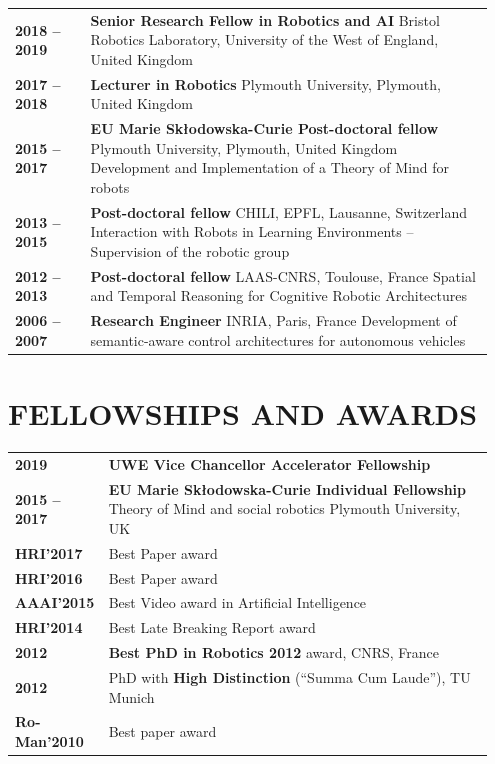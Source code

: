 \documentclass[11pt,a4paper]{report}
\begin{document}
\begin{tabular}{p{0.15\linewidth}p{0.8\linewidth}}
    \bf 2018 -- 2019 & {\bf Senior Research Fellow in Robotics and AI} \newline Bristol Robotics Laboratory, University of the West of England, United Kingdom \\
    \bf 2017 -- 2018 & {\bf Lecturer in Robotics} \newline Plymouth University, Plymouth, United Kingdom \\
    \bf 2015 -- 2017 & {\bf EU Marie Skłodowska-Curie Post-doctoral fellow}
    \newline Plymouth University, Plymouth, United Kingdom \newline \small
    Development and Implementation of a Theory of Mind for robots \\
    \bf 2013 -- 2015 & {\bf Post-doctoral fellow} \newline CHILI, EPFL,
    Lausanne, Switzerland \newline \small Interaction with Robots in Learning
    Environments – Supervision of the robotic group \\
    \bf 2012 -- 2013 & {\bf Post-doctoral fellow} \newline LAAS-CNRS, Toulouse,
    France \newline \small Spatial and Temporal Reasoning for Cognitive Robotic
    Architectures\\
    \bf 2006 -- 2007 & {\bf Research Engineer} \newline INRIA, Paris, France
    \newline \small Development of semantic-aware control architectures for
    autonomous vehicles \\
\end{tabular}


\section{FELLOWSHIPS AND AWARDS}

\begin{tabular}{p{0.15\linewidth}p{0.8\linewidth}}
    \bf 2019 & {\bf UWE Vice Chancellor Accelerator Fellowship} \\
    \bf 2015 -- 2017 & {\bf EU Marie Skłodowska-Curie Individual Fellowship}
    Theory of Mind and social robotics    \newline Plymouth University, UK \\
    \bf HRI'2017  & Best Paper award\\
    \bf HRI'2016  & Best Paper award\\
    \bf AAAI'2015  & Best Video award in Artificial Intelligence\\
    \bf HRI'2014  & Best Late Breaking Report award\\
    \bf 2012         & {\bf Best PhD in Robotics 2012} award, CNRS, France \\
    \bf 2012         & PhD with {\bf High Distinction} (“Summa Cum Laude”), TU Munich\\
    \bf Ro-Man'2010  & Best paper award\\
\end{tabular}
\end{document}
